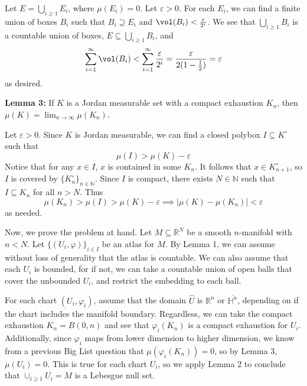 \documentclass{../../../tex-setup/eh-homework}
\begin{document}
\begin{question}{42}
        Let \(E = \bigcup_{i \geq 1} E_i\), where \(\mu (E_i) = 0\). Let \(\varepsilon > 0\). For each \(E_i\), we can find a finite union of boxes \(B_i\) such that \(B_i \supseteq E_i\) and \(\vol (B_i) < \frac{\varepsilon}{2^i}\). We see that \(\bigcup_{i\geq1}B_i\) is a countable union of boxes, \(E \subseteq \bigcup_{i\geq1}B_i\), and
        \[
            \sum_{i = 1}^{\infty} \vol (B_i) < \sum_{i=1}^{\infty} \frac{\varepsilon}{2^i} = \frac{\varepsilon}{2(1 - \frac{1}{2})} = \varepsilon
        \]
        as desired.

        \medskip

        \textbf{Lemma 3:} If \(K\) is a Jordan measurable set with a compact exhaustion \(K_n\), then \(\mu (K) = \lim_{n \to \infty} \mu (K_n)\).

        Let \(\varepsilon > 0\). Since \(K\) is Jordan measurable, we can find a closed polybox \(I \subseteq K^\circ\) such that
        \[
            \mu (I) > \mu (K) - \varepsilon
        \]
        Notice that for any \(x \in I\), \(x\) is contained in some \(K_n\). It follows that \(x \in K_{n+1} ^\circ\), so \(I\) is covered by \(\{ K_n ^\circ\} _{n \in \mathbb{N}}\). Since \(I\) is compact, there exists \(N \in \mathbb{N}\) such that \(I \subseteq K_n\) for all \(n > N\). Thus
        \[
            \mu (K_n) > \mu (I) > \mu (K) - \varepsilon \implies |\mu (K) - \mu (K_n)| < \varepsilon
        \]
        as needed.

        \medskip

        Now, we prove the problem at hand. Let \(M \subseteq \mathbb{R}^N\) be a smooth \(n\)-manifold with \(n < N\). Let \(\{ (U_i, \varphi)\}_{i \in I}\) be an atlas for \(M\). By Lemma 1, we can assume without loss of generality that the atlas is countable. We can also assume that each \(U_i\) is bounded, for if not, we can take a countable union of open balls that cover the unbounded \(U_i\), and restrict the embedding to each ball.

        For each chart \((U_i, \varphi_i)\), assume that the domain \(\hat{U}\) is \(\mathbb{R}^n\) or \(\overline{\mathbb{H}^n}\), depending on if the chart includes the manifold boundary. Regardless, we can take the compact exhaustion \(K_n = B(0, n)\) and see that \(\varphi _i (K_n)\) is a compact exhaustion for \(U_i\). Additionally, since \(\varphi _i\) maps from lower dimension to higher dimension, we know from a previous Big List question that \(\mu (\varphi _i (K_n))=0\), so by Lemma 3, \(\mu (U_i) = 0\). This is true for each chart \(U_i\), so we apply Lemma 2 to conclude that \(\cup _{i \geq 1} U_i = M\) is a Lebesgue null set.


\end{question}
\end{document}
